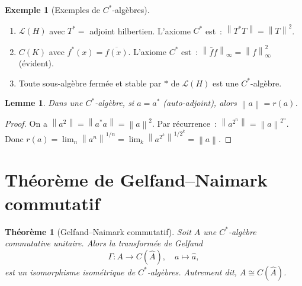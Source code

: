 \documentclass[a4paper,12pt]{book}
\newcommand{\norm}[1]{\left\| #1 \right\|}
\theoremstyle{definition}
\newtheorem{exemple}[definition]{Exemple}
\theoremstyle{plain}
\newtheorem{theoreme}[definition]{Théorème}
\newtheorem{lemme}[definition]{Lemme}
\theoremstyle{remark}
\begin{document}
\begin{exemple}[Exemples de $C^*$-algèbres]
\label{ex:cstar}
\begin{enumerate}[label=(\roman*)]
  \item $\mathcal{L}(H)$ avec $T^* =$ adjoint hilbertien. L'axiome $C^*$ est~:
        $\norm{T^*T} = \norm{T}^2$.
  \item $C(K)$ avec $f^*(x) = \overline{f(x)}$. L'axiome $C^*$ est~:
        $\norm{\bar f f}_\infty = \norm{f}_\infty^2$ (évident).
  \item Toute sous-algèbre fermée et stable par $*$ de $\mathcal{L}(H)$ est une
        $C^*$-algèbre.
\end{enumerate}
\end{exemple}

\begin{lemme}
\label{lem:cstar-autoadjoint}
Dans une $C^*$-algèbre, si $a = a^*$ (auto-adjoint), alors $\norm{a} = r(a)$.
\end{lemme}

\begin{proof}
On a $\norm{a^2} = \norm{a^*a} = \norm{a}^2$. Par récurrence~:
$\norm{a^{2^n}} = \norm{a}^{2^n}$. Donc
$r(a) = \lim_n \norm{a^n}^{1/n} = \lim_k \norm{a^{2^k}}^{1/2^k} = \norm{a}$.
\end{proof}

\section{Théorème de Gelfand--Naimark commutatif}

\begin{theoreme}[Gelfand--Naimark commutatif]
\label{thm:gelfand-naimark}
Soit $A$ une $C^*$-algèbre commutative unitaire. Alors la transformée de Gelfand
\[
  \Gamma : A \to C(\hat A), \quad a \mapsto \hat a,
\]
est un isomorphisme isométrique de $C^*$-algèbres. Autrement dit, $A \cong C(\hat A)$.
\end{theoreme}
\end{document}
